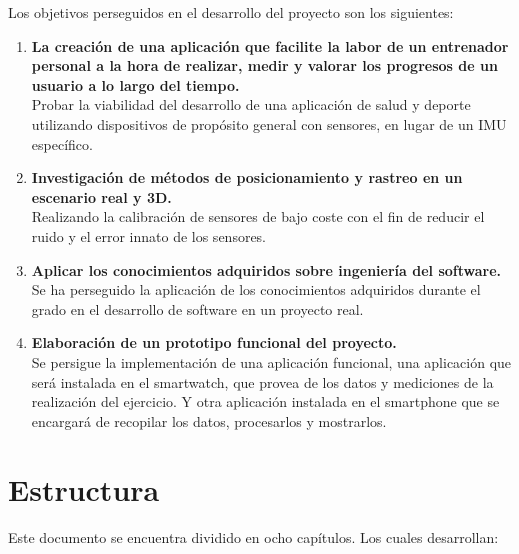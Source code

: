 Los objetivos perseguidos en el desarrollo del proyecto son los siguientes:

\begin{enumerate}
	\item  \textbf{La creación de una aplicación que facilite la labor de un entrenador personal a la hora de realizar, medir y valorar los progresos de un usuario a lo largo del tiempo.} \\
			Probar la viabilidad del desarrollo de una aplicación de salud y deporte utilizando dispositivos de propósito general con sensores, en lugar de un IMU específico.

	\item  \textbf{Investigación de métodos de posicionamiento y rastreo en un escenario real y 3D.} \\
			Realizando la calibración de sensores de bajo coste con el fin de reducir el ruido y el error innato de los sensores.

	\item \textbf{Aplicar los conocimientos adquiridos sobre ingeniería del software.} \\
			Se ha perseguido la aplicación de los conocimientos adquiridos durante el grado en el desarrollo de software en un proyecto real.

	\item  \textbf{Elaboración de un prototipo funcional del proyecto.} \\
			Se persigue la implementación de una aplicación funcional, una aplicación que será instalada en el smartwatch, que provea de los datos y mediciones de la realización del ejercicio. Y otra aplicación instalada en el smartphone que se encargará de recopilar los datos, procesarlos y mostrarlos.
\end{enumerate}

\section{Estructura}

Este documento se encuentra dividido en ocho capítulos. Los cuales desarrollan:

